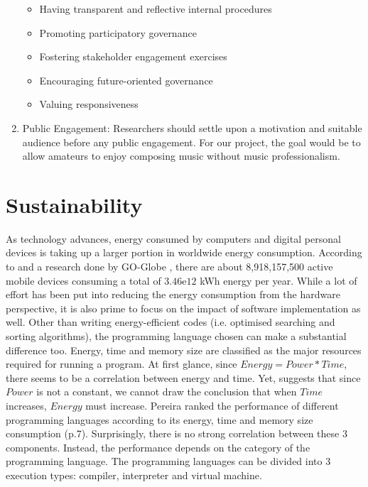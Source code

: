 \begin{enumerate}
    \begin{itemize}
        \item Having transparent and reflective internal procedures
        \item Promoting participatory governance
        \item Fostering stakeholder engagement exercises
        \item Encouraging future-oriented governance
        \item Valuing responsiveness
    \end{itemize}
    \item Public Engagement: Researchers should settle upon a motivation and suitable audience before any public engagement. For our project, the goal would be to allow amateurs to enjoy composing music without
    music professionalism.
\end{enumerate}
\section{Sustainability}
\label{Sustainability}
As technology advances, energy consumed by computers and digital personal devices is taking up a larger portion in worldwide energy consumption. 
According to \cite{energypy} and a research done by GO-Globe , there are about 8,918,157,500 active mobile devices consuming 
a total of $3.46\mathrm{e}{12}$ kWh energy per year.
While a lot of effort has been put into reducing the energy consumption from the hardware perspective,
it is also prime to focus on the impact of software implementation as well.
Other than writing energy-efficient codes (i.e. optimised searching and sorting algorithms), the programming language 
chosen can make a substantial difference too. Energy, time and memory size are classified as the major resources required for running a program.
At first glance, since \(Energy = Power * Time\), there seems to be a correlation between energy and time. Yet,
\cite{energyplanguage} suggests that since \(Power\) is not a constant, we cannot draw the conclusion that
when \(Time\) increases, \(Energy\) must increase. 
Pereira ranked the performance of different programming languages according to its energy, time and memory size consumption (p.7). 
Surprisingly, there is no strong correlation between these 3 components. 
Instead, the performance depends on the category of the programming language.
The programming languages can be divided into 3 execution types: compiler, interpreter and virtual machine.

